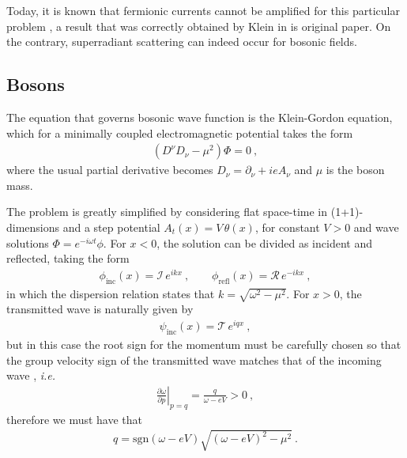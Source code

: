 Today, it is known that fermionic currents cannot be amplified for this particular problem \cite{Manogue1988,Klein1929}, a result that was correctly obtained by Klein in is original paper. 
On the contrary, superradiant scattering can indeed occur for bosonic fields.

\subsection{Bosons}

The equation that governs bosonic wave function is the Klein-Gordon equation, which for a minimally coupled electromagnetic potential takes the form
\begin{align}
    (D^\nu D_\nu - \mu^2) \Phi = 0 ~,
    \label{eq1:KleinGordon}
\end{align}
where the usual partial derivative becomes $D_\nu = \partial_\nu + i e A_\nu$ and $\mu$ is the boson mass.

The problem is greatly simplified by considering flat space-time in (1+1)-dimensions and a step potential $A_t(x) = V\,\theta(x)$, for constant $V>0$ and wave solutions $\Phi= e^{-i \omega t} \phi$.
For $x<0$, the solution can be divided as incident and reflected, taking the form
\begin{align}
    \phi_\mathrm{inc}(x) = \mathscr{I}\, e^{i k x}  ~, \qquad
    \phi_\mathrm{refl}(x) = \mathscr{R}\, e^{- i k x} ~,
    \label{eq1:KGsolneg}
\end{align}
in which the dispersion relation states that $k=\sqrt{\omega^2-\mu^2}$. For $x>0$, the transmitted wave is naturally given by 
\begin{align}
    \psi_\mathrm{inc}(x) = \mathscr{T}\, e^{i q x}  ~,
    \label{eq1:KGsolpos}
\end{align}
but in this case the root sign for the momentum must be carefully chosen so that the group velocity sign of the transmitted wave matches that of the incoming wave \cite{Manogue1988}, \textit{i.e.}
\begin{align}
    \left.\frac{\partial \omega}{\partial p}\right|_{p=q} = \frac{q}{\omega - e V} > 0 ~,
    \label{eq1:KGphasev}
\end{align}
therefore we must have that
\begin{align}
    q = \mathrm{sgn}(\omega - e V) \sqrt{ (\omega - e V)^2 - \mu^2 } ~.
    \label{eq1:KGq}
\end{align}


